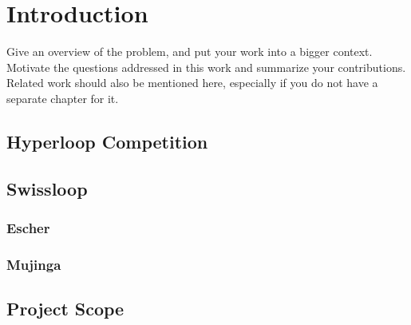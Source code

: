 
\chapter{Introduction}
Give an overview of the problem, and put your work into a bigger
context. Motivate the questions addressed in this work and summarize
your contributions. Related work should also be mentioned here,
especially if you do not have a separate chapter for it.

\section{Hyperloop Competition}


\section{Swissloop}

\subsection{Escher}

\subsection{Mujinga}

\section{Project Scope}


